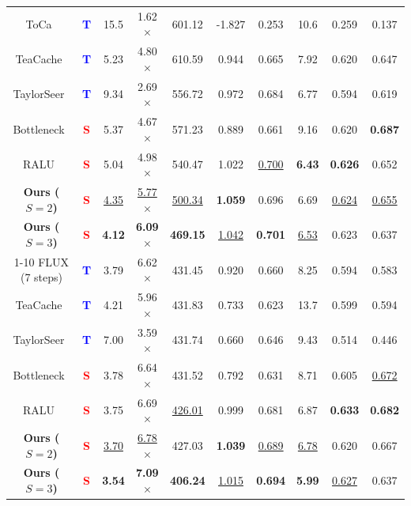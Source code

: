 \begin{table}[t!]
{\begin{scriptsize}
\begin{tabular}{cccccccccc}
        ToCa~\citep{toca}                  & \textcolor{blue}{\textbf{T}} & 15.5 & 1.62$\times$ & 601.12 & -1.827 & 0.253 & 10.6 & 0.259 & 0.137 \\
        TeaCache~\citep{teacache}          & \textcolor{blue}{\textbf{T}} & 5.23 & 4.80$\times$ & 610.59 & 0.944 & 0.665 & 7.92 & 0.620 & 0.647 \\
        TaylorSeer~\citep{taylorseer}      & \textcolor{blue}{\textbf{T}} & 9.34 & 2.69$\times$ & 556.72 & 0.972 & 0.684 & 6.77 & 0.594 & 0.619 \\
        Bottleneck~\citep{bottleneck}      & \textcolor{red}{\textbf{S}}  & 5.37 & 4.67$\times$ & 571.23 & 0.889 & 0.661 & 9.16 & 0.620 & \textbf{0.687} \\
        RALU~\citep{ralu}                  & \textcolor{red}{\textbf{S}}  & 5.04 & 4.98$\times$ & 540.47 & 1.022 & \underline{0.700} & \textbf{6.43} & \textbf{0.626} & 0.652 \\
        \textbf{Ours ($S=2$)}     & \textcolor{red}{\textbf{S}}       & \underline{4.35} & \underline{5.77}$\times$ & \underline{500.34} & \textbf{1.059} & 0.696 & 6.69 & \underline{0.624} & \underline{0.655} \\
        \textbf{Ours ($S=3$)}     & \textcolor{red}{\textbf{S}}       & \textbf{4.12} & \textbf{6.09}$\times$ & \textbf{469.15} & \underline{1.042} & \textbf{0.701} & \underline{6.53} & 0.623 & 0.637 \\
        \cmidrule(lr){1-10}
        FLUX (7 steps) & \textcolor{blue}{\textbf{T}} & 3.79 & 6.62$\times$ & 431.45 & 0.920 & 0.660 & 8.25 & 0.594 & 0.583 \\
        TeaCache~\citep{teacache}          & \textcolor{blue}{\textbf{T}} & 4.21 & 5.96$\times$ & 431.83 & 0.733 & 0.623 & 13.7 & 0.599 & 0.594 \\
        TaylorSeer~\citep{taylorseer}      & \textcolor{blue}{\textbf{T}} & 7.00 & 3.59$\times$ & 431.74 & 0.660 & 0.646 & 9.43 & 0.514 & 0.446 \\
        Bottleneck~\citep{bottleneck}      & \textcolor{red}{\textbf{S}}  & 3.78 & 6.64$\times$ & 431.52 & 0.792 & 0.631 & 8.71 & 0.605 & \underline{0.672} \\
        RALU~\citep{ralu}                  & \textcolor{red}{\textbf{S}}  & 3.75 & 6.69$\times$ & \underline{426.01} & 0.999 & 0.681 & 6.87 & \textbf{0.633} & \textbf{0.682} \\
        \textbf{Ours ($S=2$)}     & \textcolor{red}{\textbf{S}}       & \underline{3.70} & \underline{6.78}$\times$ & 427.03 & \textbf{1.039} & \underline{0.689} & \underline{6.78} & 0.620 & 0.667 \\
        \textbf{Ours ($S=3$)}     & \textcolor{red}{\textbf{S}}       & \textbf{3.54} & \textbf{7.09}$\times$ & \textbf{406.24} & \underline{1.015} & \textbf{0.694} & \textbf{5.99} & \underline{0.627} & 0.637 \\
        \bottomrule
    \end{tabular}
    \end{scriptsize}}
\end{table}
